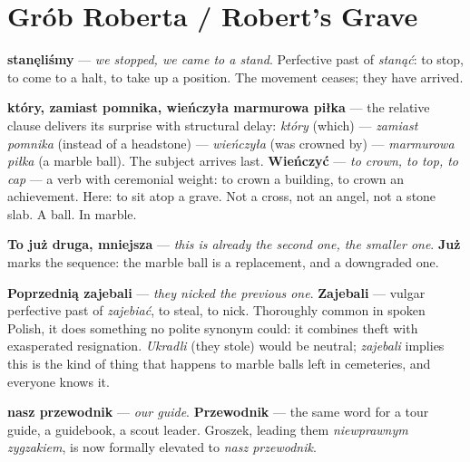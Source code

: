 \section{Grób Roberta / Robert's Grave}


\textbf{stanęliśmy} --- \textit{we stopped, we came to a stand}.
Perfective past of \textit{stanąć}: to stop, to come to a halt, to
take up a position. The movement ceases; they have arrived.

\textbf{który, zamiast pomnika, wieńczyła marmurowa piłka} --- the
relative clause delivers its surprise with structural delay:
\textit{który} (which) --- \textit{zamiast pomnika} (instead of a
headstone) --- \textit{wieńczyła} (was crowned by) ---
\textit{marmurowa piłka} (a marble ball). The subject arrives last.
\textbf{Wieńczyć} --- \textit{to crown, to top, to cap} --- a verb
with ceremonial weight: to crown a building, to crown an achievement.
Here: to sit atop a grave. Not a cross, not an angel, not a stone slab.
A ball. In marble.



\textbf{To już druga, mniejsza} --- \textit{this is already the second
one, the smaller one}. \textbf{Już} marks the sequence: the marble
ball is a replacement, and a downgraded one.

\textbf{Poprzednią zajebali} --- \textit{they nicked the previous one}.
\textbf{Zajebali} --- vulgar perfective past of \textit{zajebiać}, to
steal, to nick. Thoroughly common in spoken Polish, it does something
no polite synonym could: it combines theft with exasperated resignation.
\textit{Ukradli} (they stole) would be neutral; \textit{zajebali}
implies this is the kind of thing that happens to marble balls left in
cemeteries, and everyone knows it.

\textbf{nasz przewodnik} --- \textit{our guide}. \textbf{Przewodnik}
--- the same word for a tour guide, a guidebook, a scout leader.
Groszek, leading them \textit{niewprawnym zygzakiem}, is now formally
elevated to \textit{nasz przewodnik}.

